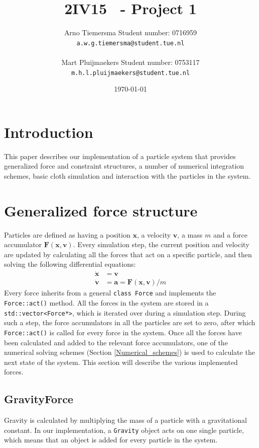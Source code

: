\documentclass[a4paper,twoside,11pt,twocolumn]{article}
\title{\sffamily\bfseries 2IV15 \scg\ - Project 1}
\author{Arno Tiemersma \qquad Student number: 0716959 \\{\tt a.w.g.tiemersma@student.tue.nl}\\ \\Mart Pluijmaekers \qquad Student number: 0753117 \\{\tt m.h.l.pluijmaekers@student.tue.nl}}
\date{\today}
\begin{document}
\maketitle
\section{Introduction}
This paper describes our implementation of a particle system that provides generalized force and constraint structures, a number of numerical integration schemes, basic cloth simulation and interaction with the particles in the system.

\section{Generalized force structure}
\label{force_structure}
Particles are defined as having a position $\mathbf{x}$, a velocity $\mathbf{v}$, a mass $m$ and a force accumulator $\mathbf{F}(\mathbf{x, v})$. Every simulation step, the current position and velocity are updated by calculating all the forces that act on a specific particle, and then solving the following differential equations:
\begin{align}
	\dot{\mathbf{x}} &= \mathbf{v}\\
	\dot{\mathbf{v}} &= \mathbf{a} = \mathbf{F}(\mathbf{x},\mathbf{v})/m
\end{align}
Every force inherits from a general \texttt{class Force} and implements the \texttt{Force::act()} method. All the forces in the system are stored in a \texttt{std::vector<Force*>}, which is iterated over during a simulation step. During such a step, the force accumulators in all the particles are set to zero, after which \texttt{Force::act()} is called for every force in the system. Once all the forces have been calculated and added to the relevant force accumulators, one of the numerical solving schemes (Section \ref{Numerical_schemes}) is used to calculate the next state of the system. This section will describe the various implemented forces.
\subsection{GravityForce}
Gravity is calculated by multiplying the mass of a particle with a gravitational constant. In our implementation, a \texttt{Gravity} object acts on one single particle, which means that an object is added for every particle in the system.
\end{document}
